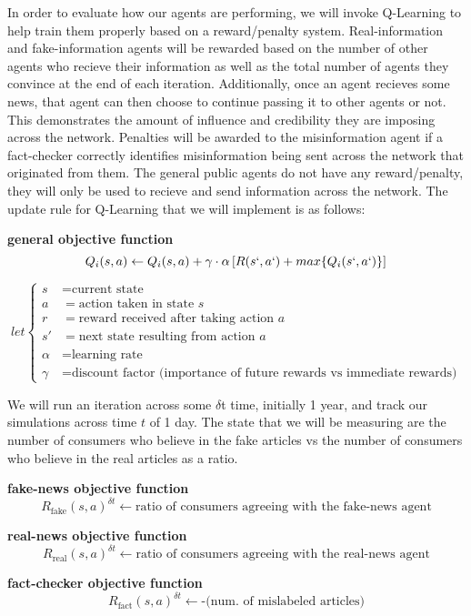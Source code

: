 \documentclass[12pt,twoside]{article}
\begin{document}
In order to evaluate how our agents are performing, we will invoke Q-Learning to help train them properly based on a reward/penalty system. Real-information and fake-information agents will be rewarded based on the number of other agents who recieve their information as well as the total number of agents they convince at the end of each iteration. Additionally, once an agent recieves some news, that agent can then choose to continue passing it to other agents or not. This demonstrates the amount of influence and credibility they are imposing across the network. Penalties will be awarded to the misinformation agent if a fact-checker correctly identifies misinformation being sent across the network that originated from them. The general public agents do not have any reward/penalty, they will only be used to recieve and send information across the network. The update rule for Q-Learning that we will implement is as follows:

\pagebreak
\textbf{general objective function}
\[Q_{i}(s, a) \leftarrow Q_{i}(s, a) + \gamma \cdot \alpha  \left[R(s`, a`) + max \{Q_{i}(s`, a`)\}\right]\]

\[
let \left\{
\begin{aligned}
s & = \text{current state} \\
a & = \text{action taken in state } s \\
r & = \text{reward received after taking action } a \\
s' & = \text{next state resulting from action } a \\
\alpha & = \text{learning rate} \\
\gamma & = \text{discount factor (importance of future rewards vs immediate rewards)}
\end{aligned}
\right.
\]

We will run an iteration across some $\delta$t time, initially 1 year, and track our simulations across time $t$ of 1 day. The state that we will be measuring are the number of consumers who believe in the fake articles vs the number of consumers who believe in the real articles as a ratio.

\textbf{fake-news objective function}
\[R_{\text{fake}}(s, a)^{\delta t} \leftarrow \text{ratio of consumers agreeing with the fake-news agent}
\]

\textbf{real-news objective function}
\[R_{\text{real}}(s, a)^{\delta t} \leftarrow \text{ratio of consumers agreeing with the real-news agent}
\]

\textbf{fact-checker objective function}
\[R_{\text{fact}}(s, a)^{\delta t} \leftarrow \text{-(num. of mislabeled articles)}
\]
\end{document}
